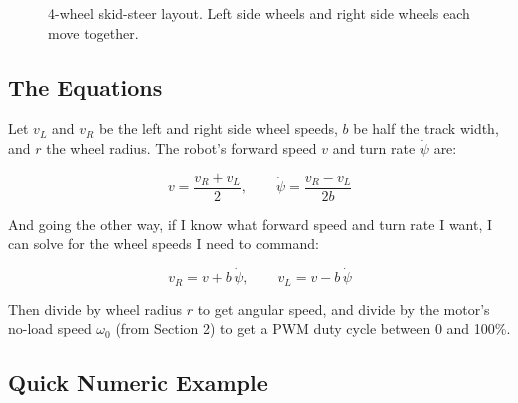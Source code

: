\documentclass[12pt,a4paper]{article}
\begin{document}
\begin{figure}[ht]
\centering
{}
\caption{4-wheel skid-steer layout. Left side wheels and right side wheels each move
together.}
\label{fig:kinematics_geom}
\end{figure}

\subsection{The Equations}

Let $v_L$ and $v_R$ be the left and right side wheel speeds, $b$ be half the track width,
and $r$ the wheel radius. The robot's forward speed $v$ and turn rate $\dot{\psi}$ are:

\begin{equation}
    v = \frac{v_R + v_L}{2}, \qquad \dot{\psi} = \frac{v_R - v_L}{2b}
    \label{eq:fwd}
\end{equation}

And going the other way, if I know what forward speed and turn rate I want, I can solve
for the wheel speeds I need to command:

\begin{equation}
    v_R = v + b\,\dot{\psi}, \qquad v_L = v - b\,\dot{\psi}
    \label{eq:inv}
\end{equation}

Then divide by wheel radius $r$ to get angular speed, and divide by the motor's no-load
speed $\omega_0$ (from Section 2) to get a PWM duty cycle between 0 and 100\%.

\subsection{Quick Numeric Example}
\end{document}
